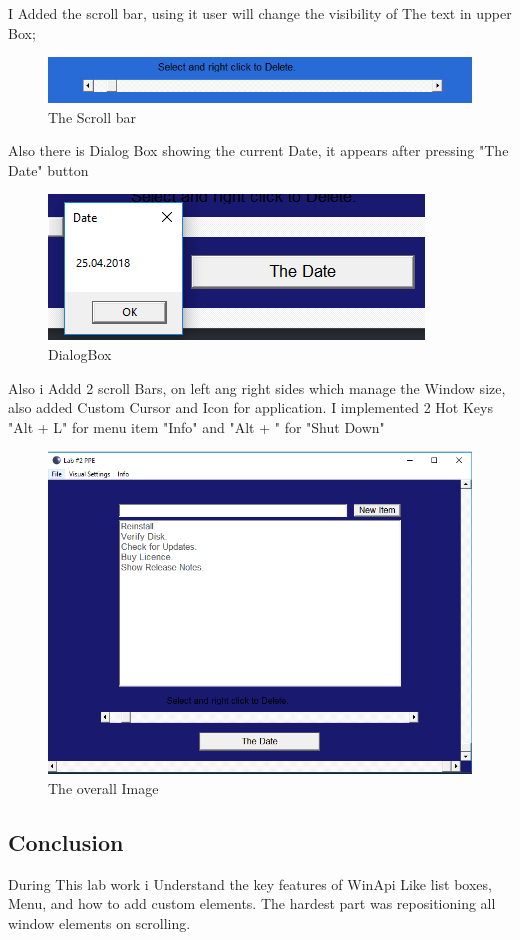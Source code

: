 \documentclass[12pt]{article}
\begin{document}
       
        
        I Added the scroll bar, using it user will change the visibility of The text in upper Box;
        \begin{figure}[H]
                \centering
                \includegraphics[width=.5\textwidth]{img2.png}
                \caption{The Scroll bar}
        \end{figure}
        \vspace{0.5 cm}
        Also there is Dialog Box showing the current Date, it appears after pressing "The Date" button
        \begin{figure}[H]
                \centering
                \includegraphics[width=.5\textwidth]{img4.png}
                \caption{DialogBox}
        \end{figure}
        \vspace{0.5 cm}
        Also i Addd 2 scroll Bars, on left ang right sides which manage the Window size, also added Custom Cursor and Icon for application. I implemented 2 Hot Keys "Alt + L" for menu item "Info" and "Alt + " for "Shut Down"
        \begin{figure}[H]
                \centering
                \includegraphics[width=.5\textwidth]{img5.png}
                \caption{The overall Image}
        \end{figure}
        \vspace{0.5 cm}
        \newpage
        \subsection*{Conclusion}
        During This lab work i Understand the key features of WinApi Like list boxes, Menu, and how to add custom elements. The hardest part was repositioning all window elements on scrolling.
        
\end{document}
